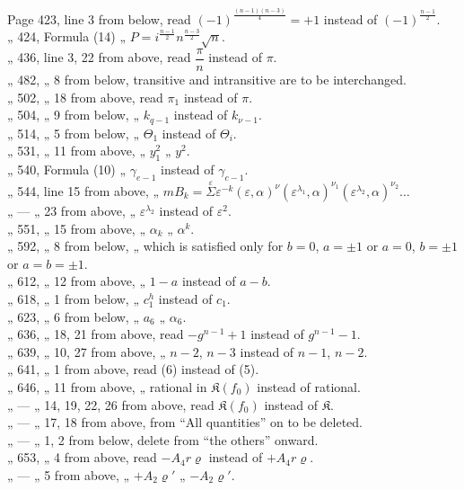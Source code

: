 \begin{flushleft}
Page 423, line 3 from below, read $(-1)^{\frac{(n-1)(n-3)}{4}}=+1$ instead of $(-1)^{\frac{n-1}{2}}$. \\
„ 424, Formula (14) „ $P=i^{\frac{n-1}{2}}n^{\frac{n-3}{2}}\sqrt{n}$. \\
„ 436, line 3, 22 from above, read $\dfrac{\pi}{n}$ instead of $\pi$. \\
„ 482, „ 8 from below, transitive and intransitive are to be interchanged. \\
„ 502, „ 18 from above, read $\pi_1$ instead of $\pi$. \\
„ 504, „ 9 from below, „ $k_{q-1}$ instead of $k_{\nu-1}$. \\
„ 514, „ 5 from below, „ $\Theta_1$ instead of $\Theta_i$. \\
„ 531, „ 11 from above, „ $y_1^2$ „ $y^2$. \\
„ 540, Formula (10) „ $\gamma_{e-1}$ instead of $\gamma_{c-1}$. \\
„ 544, line 15 from above, „ $mB_k=\overset{\varepsilon}{\Sigma}\varepsilon^{-k}(\varepsilon,\alpha)^\nu
(\varepsilon^{\lambda_1},\alpha)^{\nu_1}(\varepsilon^{\lambda_2},\alpha)^{\nu_2}\ldots$ \\
„ — „ 23 from above, „ $\varepsilon^{\lambda_2}$ instead of $\varepsilon^2$. \\
„ 551, „ 15 from above, „ $\alpha_k$ „ $\alpha^k$. \\
„ 592, „ 8 from below, „ which is satisfied only for $b=0$, $a=\pm 1$ or
$a=0$, $b=\pm 1$ or $a=b=\pm 1$. \\
„ 612, „ 12 from above, „ $1-a$ instead of $a-b$. \\
„ 618, „ 1 from below, „ $c_1^h$ instead of $c_1$. \\
„ 623, „ 6 from below, „ $a_6$ „ $\alpha_6$.
\\
„ 636, „ 18, 21 from above, read $-g^{n-1}+1$ instead of $g^{n-1}-1$. \\
„ 639, „ 10, 27 from above, „ $n-2$, $n-3$ instead of $n-1$, $n-2$. \\
„ 641, „ 1 from above, read (6) instead of (5). \\
„ 646, „ 11 from above, „ rational in $\mathfrak{K}(f_0)$ instead of rational. \\
„ — „ 14, 19, 22, 26 from above, read $\mathfrak{K}(f_0)$ instead of $\mathfrak{K}$. \\
„ — „ 17, 18 from above, from ``All quantities'' on to be deleted. \\
„ — „ 1, 2 from below, delete from ``the others'' onward. \\
„ 653, „ 4 from above, read $-A_4 r\varrho$ instead of $+A_4 r\varrho$. \\
„ — „ 5 from above, „ $+A_2\varrho'$ „ $-A_2\varrho'$.
\end{flushleft}

